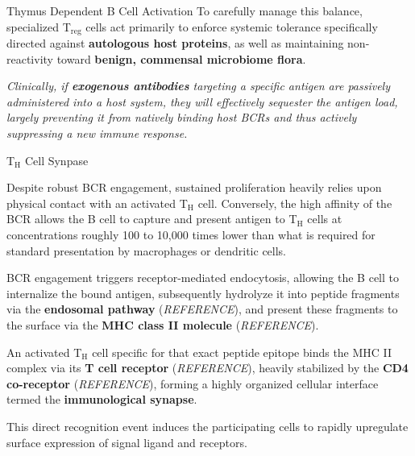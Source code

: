 \begin{core}{Thymus Dependent B Cell Activation}
        To carefully manage this balance, specialized T$_\text{reg}$ cells act primarily to enforce systemic tolerance specifically directed against \textbf{autologous host proteins}, as well as maintaining non-reactivity toward \textbf{benign, commensal microbiome flora}.

        \textit{Clinically, if \textbf{exogenous antibodies} targeting a specific antigen are passively administered into a host system, they will effectively sequester the antigen load, largely preventing it from natively binding host BCRs and thus actively suppressing a new immune response.}

      \end{core}

      \begin{core}[label=core:immune_synapse]{T$_\text{H}$ Cell Synpase}

        Despite robust BCR engagement, sustained proliferation heavily relies upon physical contact with an activated T$_\text{H}$ cell. Conversely, the high affinity of the BCR allows the B cell to capture and present antigen to T$_\text{H}$ cells at concentrations roughly 100 to 10,000 times lower than what is required for standard presentation by macrophages or dendritic cells.

        BCR engagement triggers receptor-mediated endocytosis, allowing the B cell to internalize the bound antigen, subsequently hydrolyze it into peptide fragments via the \textbf{endosomal pathway} (\textit{REFERENCE}), and present these fragments to the surface via the \textbf{MHC class II molecule} (\textit{REFERENCE}).

        An activated T$_\text{H}$ cell specific for that exact peptide epitope binds the MHC II complex via its \textbf{T cell receptor} (\textit{REFERENCE}), heavily stabilized by the \textbf{CD4 co-receptor} (\textit{REFERENCE}), forming a highly organized cellular interface termed the \textbf{immunological synapse}.

        This direct recognition event induces the participating cells to rapidly upregulate surface expression of signal ligand and receptors.


        \begin{enumerate}


\end{enumerate}
\end{core}
